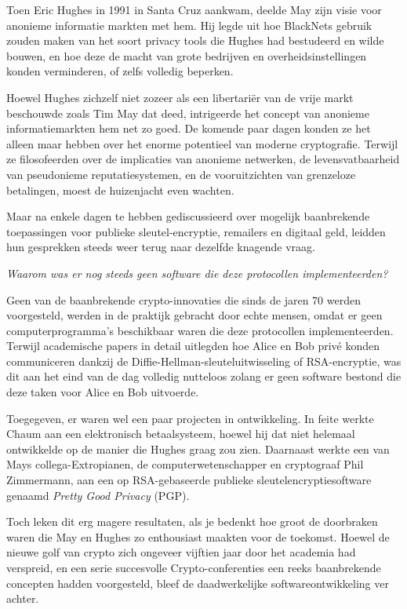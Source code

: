 \documentclass[
  a5paper,
  smalldemyvopaper,11pt,twoside,onecolumn,openright,extrafontsizes,
hidelinks]{memoir}
\begin{document}
Toen Eric Hughes in 1991 in Santa Cruz aankwam, deelde May zijn visie
voor anonieme informatie markten met hem. Hij legde uit hoe BlackNets
gebruik zouden maken van het soort privacy tools die Hughes had
bestudeerd en wilde bouwen, en hoe deze de macht van grote bedrijven en
overheidsinstellingen konden verminderen, of zelfs volledig beperken.

Hoewel Hughes zichzelf niet zozeer als een libertariër van de vrije
markt beschouwde zoals Tim May dat deed, intrigeerde het concept van
anonieme informatiemarkten hem net zo goed. De komende paar dagen konden
ze het alleen maar hebben over het enorme potentieel van moderne
cryptografie. Terwijl ze filosofeerden over de implicaties van anonieme
netwerken, de levensvatbaarheid van pseudonieme reputatiesystemen, en de
vooruitzichten van grenzeloze betalingen, moest de huizenjacht even
wachten.

Maar na enkele dagen te hebben gediscussieerd over mogelijk baanbrekende
toepassingen voor publieke sleutel-encryptie, remailers en digitaal
geld, leidden hun gesprekken steeds weer terug naar dezelfde knagende
vraag.

\emph{Waarom was er nog steeds geen software die deze protocollen
implementeerden?}

Geen van de baanbrekende crypto-innovaties die sinds de jaren 70 werden
voorgesteld, werden in de praktijk gebracht door echte mensen, omdat er
geen computerprogramma's beschikbaar waren die deze protocollen
implementeerden. Terwijl academische papers in detail uitlegden hoe
Alice en Bob privé konden communiceren dankzij de
Diffie-Hellman-sleuteluitwisseling of RSA-encryptie, was dit aan het
eind van de dag volledig nutteloos zolang er geen software bestond die
deze taken voor Alice en Bob uitvoerde.

Toegegeven, er waren wel een paar projecten in ontwikkeling. In feite
werkte Chaum aan een elektronisch betaalsysteem, hoewel hij dat niet
helemaal ontwikkelde op de manier die Hughes graag zou zien. Daarnaast
werkte een van Mays collega-Extropianen, de computerwetenschapper en
cryptograaf Phil Zimmermann, aan een op RSA-gebaseerde publieke
sleutelencryptiesoftware genaamd \emph{Pretty Good Privacy} (PGP).

Toch leken dit erg magere resultaten, als je bedenkt hoe groot de
doorbraken waren die May en Hughes zo enthousiast maakten voor de
toekomst. Hoewel de nieuwe golf van crypto zich ongeveer vijftien jaar
door het academia had verspreid, en een serie succesvolle
Crypto-conferenties een reeks baanbrekende concepten hadden voorgesteld,
bleef de daadwerkelijke softwareontwikkeling ver achter.
\end{document}
